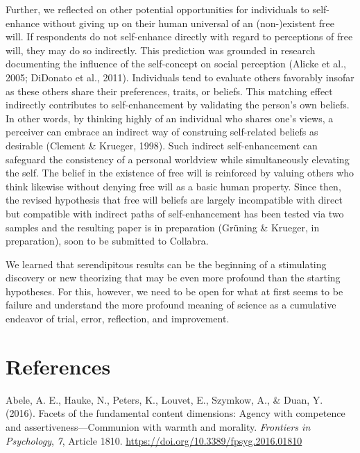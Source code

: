 \documentclass[authordate, anecdote]{jote-new-article}
\begin{document}
	Further, we reflected on other potential opportunities for individuals to self-enhance without giving up on their human universal of an (non-)existent free will. If respondents do not self-enhance directly with regard to perceptions of free will, they may do so indirectly. This prediction was grounded in research documenting the influence of the self-concept on social perception (Alicke et al., 2005; DiDonato et al., 2011). Individuals tend to evaluate others favorably insofar as these others share their preferences, traits, or beliefs. This matching effect indirectly contributes to self-enhancement by validating the person's own beliefs. In other words, by thinking highly of an individual who shares one's views, a perceiver can embrace an indirect way of construing self-related beliefs as desirable (Clement \& Krueger, 1998). Such indirect self-enhancement can safeguard the consistency of a personal worldview while simultaneously elevating the self. The belief in the existence of free will is reinforced by valuing others who think likewise without denying free will as a basic human property. Since then, the revised hypothesis that free will beliefs are largely incompatible with direct but compatible with indirect paths of self-enhancement has been tested via two samples and the resulting paper is in preparation (Grüning \& Krueger, in preparation), soon to be submitted to Collabra.



	We learned that serendipitous results can be the beginning of a stimulating discovery or new theorizing that may be even more profound than the starting hypotheses. For this, however, we need to be open for what at first seems to be failure and understand the more profound meaning of science as a cumulative endeavor of trial, error, reflection, and improvement.



	\section{References}



	Abele, A. E., Hauke, N., Peters, K., Louvet, E., Szymkow, A., \& Duan, Y. (2016). Facets of the fundamental content dimensions: Agency with competence and assertiveness—Communion with warmth and morality. \emph{Frontiers in Psychology}, \emph{7}, Article 1810. \href{https://doi.org/10.3389/fpsyg.2016.01810}{https://doi.org/10.3389/fpsyg.2016.01810}
\end{document}
